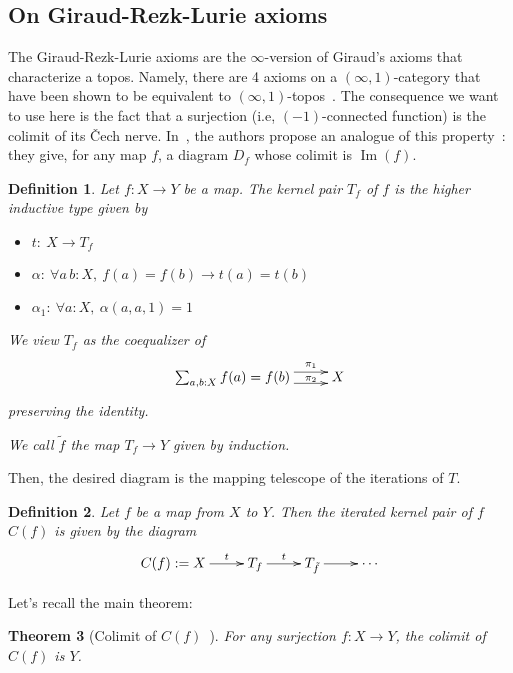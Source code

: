 \documentclass[preprint,9pt,numbers]{sigplanconf}
\makeatletter
\newtheorem{thm}{Theorem}
\newtheorem{defi}[thm]{Definition}
\newcommand{\ie}{i.e,\xspace}
\def\dar[#1]#2{\ar@<-#2>[#1]\ar@<#2>[#1]} %
\DeclareMathOperator{\im}{Im}
\newenvironment{mymath}[1][-0em]{%
  \newcommand\mymathaux{\vspace{#1}}%
  \vspace{#1}%
  \begin{equation*}%
  }{ %
    \mymathaux%
  \end{equation*}}
\makeatother
\begin{document}
\subsection{On Giraud-Rezk-Lurie axioms}
\label{sec:giraud-ax}

The Giraud-Rezk-Lurie axioms are the $\infty$-version of Giraud's
axioms that characterize a topos. Namely, there are 4 axioms on a
$(\infty,1)$-category that have been shown to be equivalent to
$(\infty,1)$-topos~\cite[Chapter 6]{lurie}.
%
The consequence we want to use here is the fact that a surjection
(\ie{} $(-1)$-connected function) is the colimit of its \v{C}ech
nerve.
%
In~\cite{boulier}, the authors propose an analogue of this property~:
they give, for any map $f$, a diagram $D_f$ whose colimit is $\im(f)$.

\begin{defi}
  Let $f:X \to Y$ be a map. The kernel pair $T_f$ of $f$ is the higher inductive type given
  by
  \begin{itemize}
  \item $t:~X \to T_f$
  \item $\alpha:~\forall a\,b:X,~f(a) = f(b) \to t(a) = t(b)$
  \item $\alpha_1:~\forall a:X,~\alpha(a, a, 1) = 1$
  \end{itemize}
  We view $T_f$ as the coequalizer of
  \begin{mymath}\xymatrix{
    \sum_{a,b:X} f(a) = f(b) \dar[r]{4pt}^-{\pi_1}_-{\pi_2} & X
  }\end{mymath}%
  preserving the identity.

  We call $\tilde f$ the map $T_f \to Y$ given by induction.
\end{defi}

Then, the desired diagram is the mapping telescope of the iterations
of $T$.
\begin{defi}
  Let $f$ be a map from $X$ to $Y$. Then the iterated kernel pair of
  $f$ $C(f)$
  is given by the diagram
  \begin{mymath}\xymatrix{
    C(f) := X \ar[r]^-t & T_f \ar[r]^-t & T_{\tilde f} \ar[r] &\cdots
  }\end{mymath}%
\end{defi}

Let's recall the main theorem:
\begin{thm}[Colimit of $C(f)$~\cite{boulier}]\label{cech}
  For any surjection $f : X \to Y$, the colimit of $C(f)$ is $Y$.
\end{thm}
\end{document}
